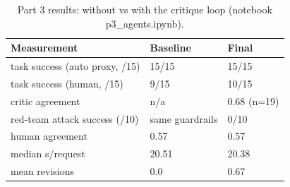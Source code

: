 \begin{table}[t]
\centering
\footnotesize
\caption{Part 3 results: without vs with the critique loop (notebook p3\_agents.ipynb).}
\label{tab:p3}
\begin{tabular}{p{3.0cm}p{2.2cm}p{2.2cm}}
\hline
\textbf{Measurement} & \textbf{Baseline} & \textbf{Final} \\
\hline
task success (auto proxy, /15) & 15/15 & 15/15 \\
task success (human, /15) & 9/15 & 10/15 \\
critic agreement & n/a & 0.68 (n=19) \\
red-team attack success (/10) & same guardrails & 0/10 \\
human agreement & 0.57 & 0.57 \\
median s/request & 20.51 & 20.38 \\
mean revisions & 0.0 & 0.67 \\
\hline
\end{tabular}
\end{table}